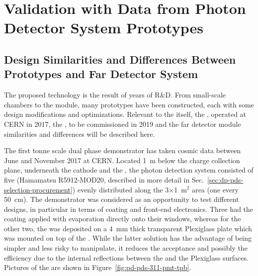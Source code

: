 \section{Validation with Data from Photon Detector System Prototypes}
\label{sec:dp-pds-prototypes}

\subsection{Design Similarities and Differences Between Prototypes and Far Detector System}
The    proposed technology is the result of years of R\&D. From small-scale chambers to the  module, many prototypes have been constructed, each with some design modifications and optimizations. 
Relevant to the  itself, the , operated at CERN in 2017, the , to be commissioned in 2019 and the  far detector module similarities and differences will be described here.

The first tonne scale dual phase   demonstrator has taken cosmic data between June and November \num{2017} at CERN. 
Located \SI{1}{m} below the charge collection plane, underneath the cathode and the , the photon detection system consisted of five  (Hamamatsu R5912-MOD20, described in more detail in Sec.~\ref{sec:dp-pds-selection-procurement}) evenly distributed along the 3$\times$1~m$^2$ area (one  every \SI{50}{cm}). The demonstrator was considered as an opportunity to test different  designs, in particular in terms of  coating and front-end electronics. Three  had the  coating applied with evaporation directly onto their windows, whereas for the other two, the  was deposited on a \SI{4}{\mm} thick transparent Plexiglass plate which was mounted on top of the . 
While the latter solution has the advantage of being simpler and less risky to manipulate, it reduces the acceptance and possibly the efficiency due to the internal reflections between the  and the Plexiglass surfaces. 
Pictures of the   are shown in Figure~\ref{fig:pd-pds-311-pmt-tpb}.

